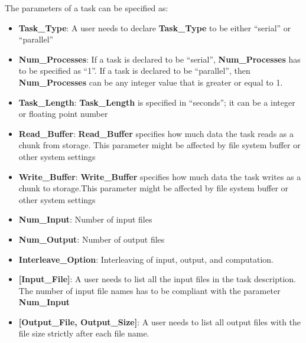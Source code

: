 \documentclass[10pt,a4paper]{article}
\begin{document}
\noindent The parameters of a task can be specified as:
\begin{itemize}
\item{\bf Task\_Type}: A user needs to declare \textbf{Task\_Type} to be either ``serial'' or ``parallel''
\item{\bf Num\_Processes}: If a task is declared to be ``serial'', \textbf{Num\_Processes} has to be specified as ``1''. If a task is declared to be ``parallel'', then \textbf{Num\_Processes} can be any integer value that is greater or equal to 1.
\item{\bf Task\_Length}: \textbf{Task\_Length} is specified in ``seconds''; it can be a integer or floating point number
\item{\bf Read\_Buffer}: \textbf{Read\_Buffer} specifies how much data the task reads as a chunk from storage. This parameter might be affected by file system buffer or other system settings
\item{\bf Write\_Buffer}: \textbf{Write\_Buffer} specifies how much data the task writes as a chunk to storage.This parameter might be affected by file system buffer or other system settings
\item{\bf Num\_Input}: Number of input files
\item{\bf Num\_Output}: Number of output files
\item{\bf Interleave\_Option}: Interleaving of input, output, and computation.
\item{\bf [Input\_File]}: A user needs to list all the input files in the task description. The number of input file names has to be compliant with the parameter \textbf{Num\_Input}
\item{\bf [Output\_File, Output\_Size]}: A user needs to list all output files with the file size strictly after each file name.
\end{itemize}
\end{document}

